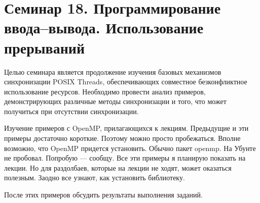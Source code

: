 \chapter[18]{Семинар 18. Программирование ввода--вывода. Использование прерываний}

Целью семинара является продолжение изучения базовых механизмов синхронизации POSIX Threads, обеспечивающих совместное безконфликтное использование ресурсов. Необходимо провести анализ примеров, демонстрирующих различные методы синхронизации и того, что может получиться при отсутствии синхронизации.

Изучение примеров с OpenMP, прилагающихся к лекциям. Предыдущие и эти примеры достаточно короткие. Поэтому можно просто пробежаться. Вполне возможно, что OpenMP придется установить. Обычно пакет openmp. На Убунте не пробовал. Попробую --- сообщу. Все эти примеры я планирую показать на лекции. Но для раздолбаев, которые на лекции не ходят, может оказаться полезным. Заодно все узнают, как установить библиотеку.

После этих примеров обсудить результаты выполнения заданий.

